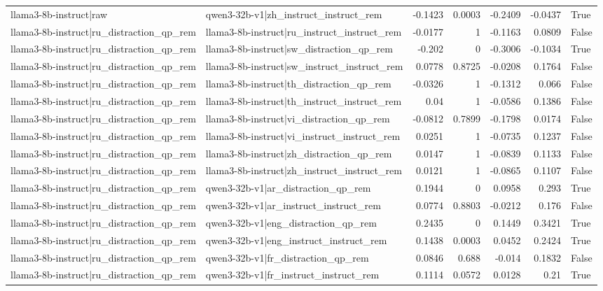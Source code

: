 \begin{table}
\begin{tabular}{l l r r r r l}
llama3-8b-instruct|raw & qwen3-32b-v1|zh_instruct_instruct_rem & -0.1423 & 0.0003 & -0.2409 & -0.0437 & True \\
llama3-8b-instruct|ru_distraction_qp_rem & llama3-8b-instruct|ru_instruct_instruct_rem & -0.0177 & 1 & -0.1163 & 0.0809 & False \\
llama3-8b-instruct|ru_distraction_qp_rem & llama3-8b-instruct|sw_distraction_qp_rem & -0.202 & 0 & -0.3006 & -0.1034 & True \\
llama3-8b-instruct|ru_distraction_qp_rem & llama3-8b-instruct|sw_instruct_instruct_rem & 0.0778 & 0.8725 & -0.0208 & 0.1764 & False \\
llama3-8b-instruct|ru_distraction_qp_rem & llama3-8b-instruct|th_distraction_qp_rem & -0.0326 & 1 & -0.1312 & 0.066 & False \\
llama3-8b-instruct|ru_distraction_qp_rem & llama3-8b-instruct|th_instruct_instruct_rem & 0.04 & 1 & -0.0586 & 0.1386 & False \\
llama3-8b-instruct|ru_distraction_qp_rem & llama3-8b-instruct|vi_distraction_qp_rem & -0.0812 & 0.7899 & -0.1798 & 0.0174 & False \\
llama3-8b-instruct|ru_distraction_qp_rem & llama3-8b-instruct|vi_instruct_instruct_rem & 0.0251 & 1 & -0.0735 & 0.1237 & False \\
llama3-8b-instruct|ru_distraction_qp_rem & llama3-8b-instruct|zh_distraction_qp_rem & 0.0147 & 1 & -0.0839 & 0.1133 & False \\
llama3-8b-instruct|ru_distraction_qp_rem & llama3-8b-instruct|zh_instruct_instruct_rem & 0.0121 & 1 & -0.0865 & 0.1107 & False \\
llama3-8b-instruct|ru_distraction_qp_rem & qwen3-32b-v1|ar_distraction_qp_rem & 0.1944 & 0 & 0.0958 & 0.293 & True \\
llama3-8b-instruct|ru_distraction_qp_rem & qwen3-32b-v1|ar_instruct_instruct_rem & 0.0774 & 0.8803 & -0.0212 & 0.176 & False \\
llama3-8b-instruct|ru_distraction_qp_rem & qwen3-32b-v1|eng_distraction_qp_rem & 0.2435 & 0 & 0.1449 & 0.3421 & True \\
llama3-8b-instruct|ru_distraction_qp_rem & qwen3-32b-v1|eng_instruct_instruct_rem & 0.1438 & 0.0003 & 0.0452 & 0.2424 & True \\
llama3-8b-instruct|ru_distraction_qp_rem & qwen3-32b-v1|fr_distraction_qp_rem & 0.0846 & 0.688 & -0.014 & 0.1832 & False \\
llama3-8b-instruct|ru_distraction_qp_rem & qwen3-32b-v1|fr_instruct_instruct_rem & 0.1114 & 0.0572 & 0.0128 & 0.21 & True \\

\end{tabular}
\end{table}
